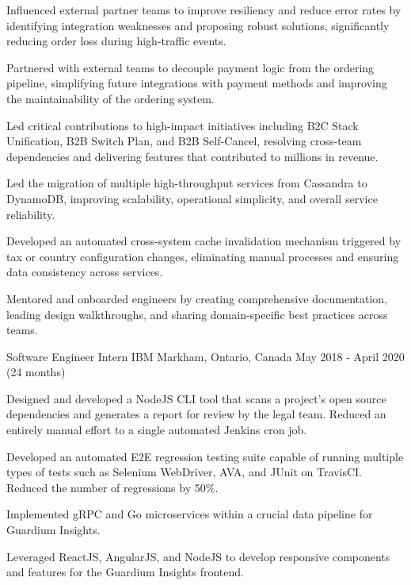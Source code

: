 \begin{cventries}
{\begin{cvitems}
\item {Influenced external partner teams to improve resiliency and reduce error rates by identifying integration weaknesses and proposing robust solutions, significantly reducing order loss during high-traffic events.}
\item {Partnered with external teams to decouple payment logic from the ordering pipeline, simplifying future integrations with payment methods and improving the maintainability of the ordering system.}
\item {Led critical contributions to high-impact initiatives including B2C Stack Unification, B2B Switch Plan, and B2B Self-Cancel, resolving cross-team dependencies and delivering features that contributed to millions in revenue.}
\item {Led the migration of multiple high-throughput services from Cassandra to DynamoDB, improving scalability, operational simplicity, and overall service reliability.}
\item {Developed an automated cross-system cache invalidation mechanism triggered by tax or country configuration changes, eliminating manual processes and ensuring data consistency across services.}
\item {Mentored and onboarded engineers by creating comprehensive documentation, leading design walkthroughs, and sharing domain-specific best practices across teams.}
\end{cvitems}
}


\cventry
{Software Engineer Intern} %
{IBM} %
{Markham, Ontario, Canada} %
{May 2018 - April 2020 (24 months)} %
{ %
\begin{cvitems}
\item {Designed and developed a NodeJS CLI tool that scans a project's open source dependencies and generates a report for review by the legal team. Reduced an entirely manual effort to a single automated Jenkins cron job.}
\item {Developed an automated E2E regression testing suite capable of running multiple types of tests such as Selenium WebDriver, AVA, and JUnit on TravisCI. Reduced the number of regressions by 50\%.}
\item {Implemented gRPC and Go microservices within a crucial data pipeline for Guardium Insights.}
\item {Leveraged ReactJS, AngularJS, and NodeJS to develop responsive components and features for the Guardium Insights frontend.}
\end{cvitems}
}


\end{cventries}

